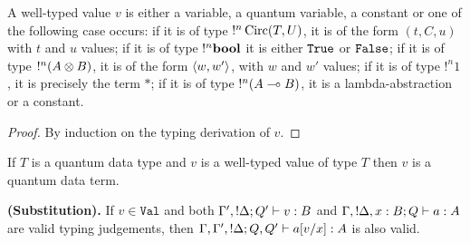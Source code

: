 \documentclass[twoside]{article}
\begin{document}
\begin{lemma}
\label{form_values}
A well-typed value $v$ is either a variable, a quantum variable, a constant or one 
of the following case occurs: if it is of type $!^n\mathop{\textrm{Circ}}\nolimits(T,U)$, it is of the 
form $(t,C,u)$ with $t$ and $u$ values; if it is of type $!^n\textrm{\bf bool}$ it is either 
$\texttt{True}$ or $\texttt{False}$; if it is of type $!^n (A\otimes B)$, it is of the
form $\langle w,w'\rangle$, with $w$ and $w'$ values; if it is of type $!^n1$, it is 
precisely the term $*$; if it is of type $!^n (A\multimap B)$, it is a 
lambda-abstraction or a constant.
\end{lemma}

\begin{proof}
By induction on the typing derivation of $v$.
\end{proof}

\begin{corollary}
\label{typed_qd_term}
If $T$ is a quantum data type and $v$ is a well-typed value of type $T$ then $v$ is 
a quantum data term.
\end{corollary}

\begin{lemma}
{\bf (Substitution).}
\label{substitution}
If $v\in\mathtt{Val}$ and both $\Gamma',!\Delta;Q' \vdash v:B$ and 
$\Gamma,!\Delta,x:B;Q \vdash a:A$ are valid typing judgements, 
then $\Gamma,\Gamma',!\Delta;Q,Q' \vdash a[v/x]:A$ is also valid.
\end{lemma}
\end{document}
